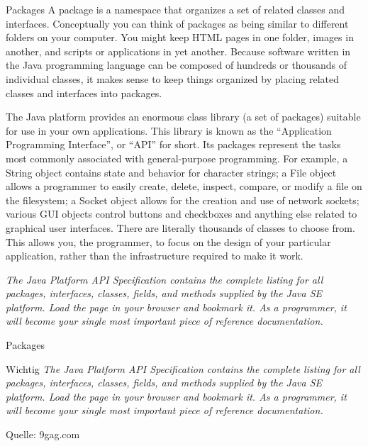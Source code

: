 \documentclass[18pt]{beamer}
\begin{document}
\begin{frame}{Packages}
\scriptsize
A package is a namespace that organizes a set of related classes and interfaces. 
Conceptually you can think of packages as being similar to different folders on your computer. 
You might keep HTML pages in one folder, images in another, and scripts or applications in yet another. 
Because software written in the Java programming language can be composed of hundreds or thousands of 
individual classes, it makes sense to keep things organized by placing related classes and interfaces into packages.

The Java platform provides an enormous class library (a set of packages) suitable for use in your own 
applications. This library is known as the ``Application Programming Interface'', or ``API'' for short. 
Its packages represent the tasks most commonly associated with general-purpose programming. For example, 
a String object contains state and behavior for character strings; a File object allows a programmer to easily 
create, delete, inspect, compare, or modify a file on the filesystem; a Socket object allows for the creation
and use of network sockets; various GUI objects control buttons and checkboxes and anything else related to 
graphical user interfaces. There are literally thousands of classes to choose from. This allows you, the programmer, 
to focus on the design of your particular application, rather than the infrastructure required to make it work.

\emph{The Java Platform API Specification contains the complete listing for all packages, interfaces, classes, fields, 
and methods supplied by the Java SE platform. Load the page in your browser and bookmark it. As a programmer, 
it will become your single most important piece of reference documentation.}

\end{frame}

\begin{frame}{Packages}
\begin{alertblock}{Wichtig}
\Large
\emph{The Java Platform API Specification contains the complete listing for all packages, interfaces, classes, fields, 
and methods supplied by the Java SE platform. Load the page in your browser and bookmark it. As a programmer, 
it will become your single most important piece of reference documentation.}
 
\end{alertblock}

\end{frame}

\begin{frame}
 
 \tiny{Quelle: 9gag.com}
\end{frame}
\end{document}

